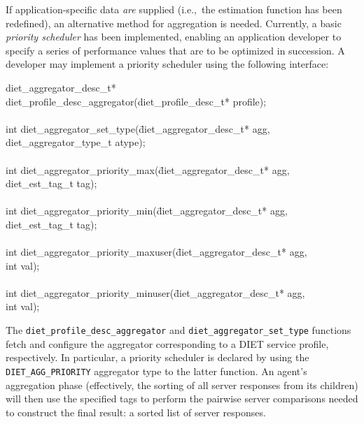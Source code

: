 If application-specific data \emph{are} supplied (i.e.,~the
estimation function has been redefined), an alternative method for
aggregation is needed.  Currently, a basic
\emph{priority scheduler} has been implemented, enabling an
application developer to specify a series of performance values that
are to be optimized in succession.  A developer may implement a
priority scheduler using the following interface:
\begin{code}
\begin{tabbing}
diet\_aggregator\_desc\_t* \\
diet\_profile\_desc\_aggregator(diet\_profile\_desc\_t* profile); \\
\\
int diet\_aggregator\_set\_type(\=diet\_aggregator\_desc\_t* agg, \\
\> diet\_aggregator\_type\_t atype); \\
\\
int diet\_aggregator\_priority\_max(\=diet\_aggregator\_desc\_t* agg, \\
\> diet\_est\_tag\_t tag); \\
\\
int diet\_aggregator\_priority\_min(\=diet\_aggregator\_desc\_t* agg, \\
\> diet\_est\_tag\_t tag); \\
\\
int diet\_aggregator\_priority\_maxuser(\=diet\_aggregator\_desc\_t* agg, \\
\> int val); \\
\\
int diet\_aggregator\_priority\_minuser(\=diet\_aggregator\_desc\_t* agg, \\
\> int val); \\
\end{tabbing}
\end{code}
The \texttt{diet\_profile\_desc\_aggregator} and
\texttt{diet\_aggregator\_set\_type} functions fetch and configure the
aggregator corresponding to a DIET service profile, respectively.
In particular, a priority scheduler is declared by using the
\texttt{DIET\_AGG\_PRIORITY} aggregator type to the latter function.
An agent's aggregation phase (effectively, the sorting of all server
responses from its children) will then use the specified tags to
perform the pairwise server comparisons needed to construct the final
result: a sorted list of server responses.

